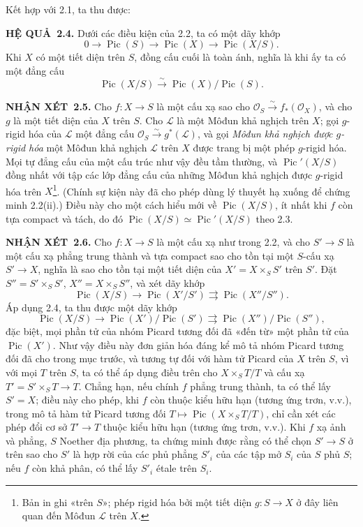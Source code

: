 \documentclass[11pt,twoside,openany]{book}
\numberwithin{equation}{section}
\newcommand{\src}[1]{%
  \phantomsection\hypertarget{src:\fgasourceid:#1}{}%
  \marginpar{\raggedleft\footnotesize\sffamily #1}%
}
\newcommand{\fgasourceid}{unset}
\newcommand{\result}[2]{\par\medskip\noindent\textbf{#1\if\relax\detokenize{#2}\relax\else\ #2\fi.}\quad}
\begin{document}
Kết hợp với 2.1, ta thu được:

\result{HỆ QUẢ}{2.4} Dưới các điều kiện của 2.2, ta có một dãy khớp
\[
0\longrightarrow\operatorname{Pic}(S)\longrightarrow\operatorname{Pic}(X)
\longrightarrow\operatorname{Pic}(X/S).
\]
Khi $X$ có một tiết diện trên $S$, đồng cấu cuối là toàn ánh, nghĩa là khi ấy
ta có một đẳng cấu
\[
\operatorname{Pic}(X/S)\xrightarrow{\sim}
\operatorname{Pic}(X)/\operatorname{Pic}(S).
\]

\result{NHẬN XÉT}{2.5} Cho $f:X\longrightarrow S$ là một cấu xạ sao cho
$\mathcal O_S\xrightarrow{\sim}f_*(\mathcal O_X)$, và cho $g$ là một tiết
diện của $X$ trên $S$. Cho $\mathcal L$ là một Môđun khả nghịch trên $X$; gọi
$g$-rigid hóa của $\mathcal L$ một đẳng cấu
$\mathcal O_S\xrightarrow{\sim}g^*(\mathcal L)$, và gọi
\emph{Môđun khả nghịch được $g$-rigid hóa} một Môđun khả nghịch $\mathcal L$
trên $X$ được trang bị một phép $g$-rigid hóa. Mọi tự đẳng cấu của một cấu
trúc như vậy đều tầm thường, và
$\operatorname{Pic}'(X/S)$ đồng nhất với tập các lớp đẳng cấu của những Môđun
khả nghịch được $g$-rigid hóa trên $X$\footnote{Bản in ghi «trên $S$»; phép
rigid hóa bởi một tiết diện $g:S\to X$ ở đây liên quan đến Môđun
$\mathcal L$ trên $X$.}. (Chính sự kiện này đã cho phép dùng lý thuyết hạ
xuống để chứng minh 2.2(ii).) Điều này cho một cách hiểu mới về
$\operatorname{Pic}(X/S)$, ít nhất khi $f$ còn tựa compact và tách, do đó
$\operatorname{Pic}(X/S)\simeq\operatorname{Pic}'(X/S)$ theo 2.3.
\src{148}
\result{NHẬN XÉT}{2.6} Cho $f:X\longrightarrow S$ là một cấu xạ như trong
2.2, và cho $S'\longrightarrow S$ là một cấu xạ phẳng trung thành và tựa
compact sao cho tồn tại một $S$-cấu xạ $S'\longrightarrow X$, nghĩa là sao cho
tồn tại một tiết diện của $X'=X\times_SS'$ trên $S'$. Đặt
$S''=S'\times_SS'$, $X''=X\times_SS''$, và xét dãy khớp
\[
\operatorname{Pic}(X/S)\longrightarrow\operatorname{Pic}(X'/S')
\rightrightarrows\operatorname{Pic}(X''/S'').
\]
Áp dụng 2.4, ta thu được một dãy khớp
\[
\operatorname{Pic}(X/S)\longrightarrow
\operatorname{Pic}(X')/\operatorname{Pic}(S')
\rightrightarrows
\operatorname{Pic}(X'')/\operatorname{Pic}(S''),
\]
đặc biệt, mọi phần tử của nhóm Picard tương đối đã «đến từ» một phần tử của
$\operatorname{Pic}(X')$. Như vậy điều này đơn giản hóa đáng kể mô tả nhóm
Picard tương đối đã cho trong mục trước, và tương tự đối với hàm tử Picard của
$X$ trên $S$, vì với mọi $T$ trên $S$, ta có thể áp dụng điều trên cho
$X\times_ST/T$ và cấu xạ $T'=S'\times_ST\longrightarrow T$. Chẳng hạn, nếu
chính $f$ phẳng trung thành, ta có thể lấy $S'=X$; điều này cho phép, khi $f$
còn thuộc kiểu hữu hạn (tương ứng trơn, v.v.), trong mô tả hàm tử Picard tương
đối $T\longmapsto\operatorname{Pic}(X\times_ST/T)$, chỉ cần xét các phép đổi
cơ sở $T'\longrightarrow T$ thuộc kiểu hữu hạn (tương ứng trơn, v.v.). Khi
$f$ xạ ảnh và phẳng, $S$ Noether địa phương, ta chứng minh được rằng có thể
chọn $S'\longrightarrow S$ ở trên sao cho $S'$ là hợp rời của các phủ phẳng
$S'_i$ của các tập mở $S_i$ của $S$ phủ $S$; nếu $f$ còn khả phân, có thể lấy $S'_i$
étale trên $S_i$.
\end{document}
